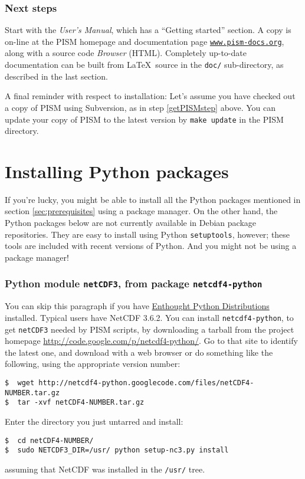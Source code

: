 \documentclass[11pt,final]{amsart}
\renewcommand{\t}[1]{\texttt{#1}}
\begin{document}
\subsubsection*{Next steps}  Start with the \emph{User's Manual}, which has a ``Getting started'' section.  A copy is on-line at the PISM homepage and documentation page \href{http://www.pism-docs.org/}{\t{www.pism-docs.org}}, along with a source code \emph{Browser} (HTML).  Completely up-to-date documentation can be built from \LaTeX~source in the \texttt{doc/} sub-directory, as described in the last section.

A final reminder with respect to installation:  Let's assume you have checked out a copy of PISM using Subversion, as in step \ref{getPISMstep} above.  You can update your copy of PISM to the latest version by \texttt{make update} in the PISM directory.


\newpage
\section{Installing Python packages}
\label{sec:python}

If you're lucky, you might be able to install all the Python packages mentioned in section \ref{sec:prerequisites} using a package manager. On the other hand, the Python packages below are not currently available in Debian package repositories. They are easy to install using Python \texttt{setuptools}, however; these tools are included with recent versions of Python.  And you might not be using a package manager!

\subsubsection*{Python module \texttt{netCDF3}, from package \texttt{netcdf4-python}}  You can skip this paragraph if you have \href{http://www.enthought.com/}{Enthought Python Distributions} installed. Typical users have NetCDF 3.6.2.  You can install \texttt{netcdf4-python}, to get \texttt{netCDF3} needed by PISM scripts, by downloading a tarball from the project homepage \url{http://code.google.com/p/netcdf4-python/}.  Go to that site to identify the latest one, and download with a web browser or do something like the following, using the appropriate version number:
\begin{verbatim}
$  wget http://netcdf4-python.googlecode.com/files/netCDF4-NUMBER.tar.gz
$  tar -xvf netCDF4-NUMBER.tar.gz
\end{verbatim}
Enter the directory you just untarred and install:
\begin{verbatim}
$  cd netCDF4-NUMBER/
$  sudo NETCDF3_DIR=/usr/ python setup-nc3.py install
\end{verbatim}
assuming that NetCDF was installed in the \texttt{/usr/} tree.
\end{document}
